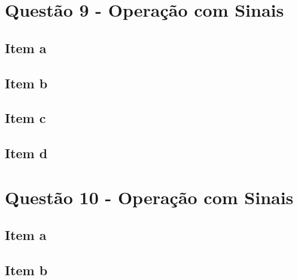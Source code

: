 \documentclass[a4paper, 12pt]{article}
\begin{document}
    \section{Quest\~{a}o 9 - Operação com Sinais}
        \subsection{Item a}
        \subsection{Item b}
        \subsection{Item c}
        \subsection{Item d}
    \section{Quest\~{a}o 10 - Operação com Sinais}
        \subsection{Item a}
        \subsection{Item b}
\end{document}
